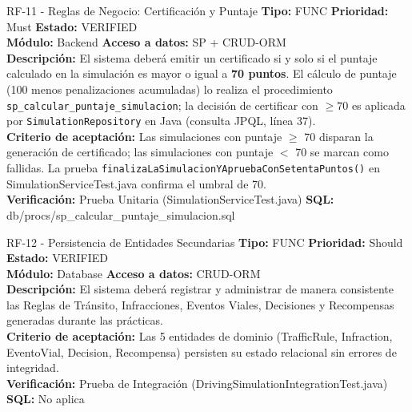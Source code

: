 \documentclass[11pt,a4paper]{article}
\begin{document}
\begin{requisito}{RF-11 - Reglas de Negocio: Certificación y Puntaje}
    \textbf{Tipo:} FUNC \quad \textbf{Prioridad:} Must \quad \textbf{Estado:} VERIFIED \\[0.2cm]
    \textbf{Módulo:} Backend \quad \textbf{Acceso a datos:} SP + CRUD-ORM \\[0.2cm]
    \textbf{Descripción:} El sistema deberá emitir un certificado si y solo si el puntaje calculado en la simulación es mayor o igual a \textbf{70 puntos}. El cálculo de puntaje (100 menos penalizaciones acumuladas) lo realiza el procedimiento \texttt{sp\_calcular\_puntaje\_simulacion}; la decisión de certificar con $\geq 70$ es aplicada por \texttt{SimulationRepository} en Java (consulta JPQL, línea 37). \\[0.2cm]
    \textbf{Criterio de aceptación:} Las simulaciones con puntaje $\geq$ 70 disparan la generación de certificado; las simulaciones con puntaje $<$ 70 se marcan como fallidas. La prueba \texttt{finalizaLaSimulacionYApruebaConSetentaPuntos()} en SimulationServiceTest.java confirma el umbral de 70. \\[0.2cm]
    \textbf{Verificación:} Prueba Unitaria (SimulationServiceTest.java) \quad \textbf{SQL:} db/procs/sp\_calcular\_puntaje\_simulacion.sql
\end{requisito}

\begin{requisito}{RF-12 - Persistencia de Entidades Secundarias}
    \textbf{Tipo:} FUNC \quad \textbf{Prioridad:} Should \quad \textbf{Estado:} VERIFIED \\[0.2cm]
    \textbf{Módulo:} Database \quad \textbf{Acceso a datos:} CRUD-ORM \\[0.2cm]
    \textbf{Descripción:} El sistema deberá registrar y administrar de manera consistente las Reglas de Tránsito, Infracciones, Eventos Viales, Decisiones y Recompensas generadas durante las prácticas. \\[0.2cm]
    \textbf{Criterio de aceptación:} Las 5 entidades de dominio (TrafficRule, Infraction, EventoVial, Decision, Recompensa) persisten su estado relacional sin errores de integridad. \\[0.2cm]
    \textbf{Verificación:} Prueba de Integración (DrivingSimulationIntegrationTest.java) \quad \textbf{SQL:} No aplica
\end{requisito}
\end{document}
